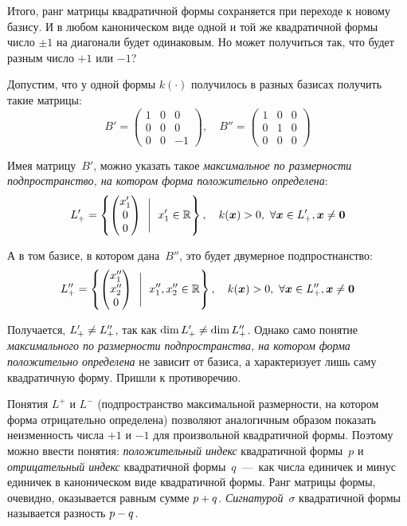 \documentclass[a4paper,12pt]{article}
\begin{document}
  Итого, ранг матрицы квадратичной формы сохраняется при переходе к новому базису.
  И в любом каноническом виде одной и той же квадратичной формы число $\pm 1$ на диагонали будет одинаковым.
  Но может получиться так, что будет разным число $+1$ или $-1$?
  
  \begin{example}
    Допустим, что у одной формы $k(\cdot)$ получилось в разных базисах получить такие матрицы:
    \[
      B' = \begin{pmatrix}
        1 & 0 & 0\\
        0 & 0 & 0\\
        0 & 0 & -1
      \end{pmatrix},\quad B'' = \begin{pmatrix}
        1 & 0 & 0\\
        0 & 1 & 0\\
        0 & 0 & 0
      \end{pmatrix}
    \]
    
    Имея матрицу~$B'$, можно указать такое \emph{максимальное по размерности подпространство, на котором форма положительно определена}:
    \[
      L'_{+} = \left\{
        \begin{pmatrix}
          x_1'\\
          0\\
          0
        \end{pmatrix}\ \Biggm|\ x_1' \in \operatorname{\mathbb R}
      \right\},\quad k(\boldsymbol x) > 0,\ \forall \boldsymbol x \in L'_{+}, \boldsymbol x \not= \boldsymbol 0
    \]
    
    А в том базисе, в котором дана~$B''$, это будет двумерное подпростнанство:
    \[
      L''_{+} = \left\{
        \begin{pmatrix}
          x_1''\\
          x_2''\\
          0
        \end{pmatrix}\ \Biggm|\ x_1'', x_2'' \in \operatorname{\mathbb R}
      \right\},\quad k(\boldsymbol x) > 0,\ \forall \boldsymbol x \in L''_{+}, \boldsymbol x \not= \boldsymbol 0
    \]
    
    Получается, $L'_{+} \hm{\not=} L''_{+}$, так как $\dim L'_{+} \hm{\not=} \dim L''_{+}$.
    Однако само понятие \emph{максимального по размерности подпространства, на котором форма положительно определена} не зависит от базиса, а характеризует лишь саму квадратичную форму.
    Пришли к противоречию.
  \end{example}
  
  Понятия $L^{+}$ и $L^{-}$ (подпространство максимальной размерности, на котором форма отрицательно определена) позволяют аналогичным образом показать неизменность числа $+1$ и $-1$ для произвольной квадратичной формы.
  Поэтому можно ввести понятия: \emph{положительный индекс} квадратичной формы~$p$ и \emph{отрицательный индекс} квадратичной формы~$q$~---~как числа единичек и минус единичек в каноническом виде квадратичной формы.
  Ранг матрицы формы, очевидно, оказывается равным сумме $p \hm+ q$.
  \emph{Сигнатурой}~$\sigma$ квадратичной формы называется разность $p \hm- q$.
  
\end{document}
